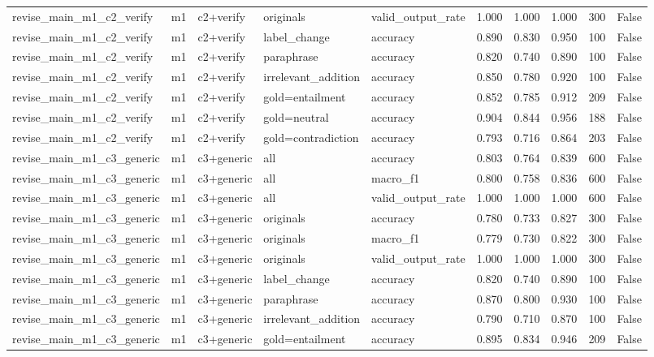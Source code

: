 \begin{tabular}{llllllllll}
revise\_main\_m1\_c2\_verify & m1 & c2+verify & originals & valid\_output\_rate & 1.000 & 1.000 & 1.000 & 300 & False \\
revise\_main\_m1\_c2\_verify & m1 & c2+verify & label\_change & accuracy & 0.890 & 0.830 & 0.950 & 100 & False \\
revise\_main\_m1\_c2\_verify & m1 & c2+verify & paraphrase & accuracy & 0.820 & 0.740 & 0.890 & 100 & False \\
revise\_main\_m1\_c2\_verify & m1 & c2+verify & irrelevant\_addition & accuracy & 0.850 & 0.780 & 0.920 & 100 & False \\
revise\_main\_m1\_c2\_verify & m1 & c2+verify & gold=entailment & accuracy & 0.852 & 0.785 & 0.912 & 209 & False \\
revise\_main\_m1\_c2\_verify & m1 & c2+verify & gold=neutral & accuracy & 0.904 & 0.844 & 0.956 & 188 & False \\
revise\_main\_m1\_c2\_verify & m1 & c2+verify & gold=contradiction & accuracy & 0.793 & 0.716 & 0.864 & 203 & False \\
revise\_main\_m1\_c3\_generic & m1 & c3+generic & all & accuracy & 0.803 & 0.764 & 0.839 & 600 & False \\
revise\_main\_m1\_c3\_generic & m1 & c3+generic & all & macro\_f1 & 0.800 & 0.758 & 0.836 & 600 & False \\
revise\_main\_m1\_c3\_generic & m1 & c3+generic & all & valid\_output\_rate & 1.000 & 1.000 & 1.000 & 600 & False \\
revise\_main\_m1\_c3\_generic & m1 & c3+generic & originals & accuracy & 0.780 & 0.733 & 0.827 & 300 & False \\
revise\_main\_m1\_c3\_generic & m1 & c3+generic & originals & macro\_f1 & 0.779 & 0.730 & 0.822 & 300 & False \\
revise\_main\_m1\_c3\_generic & m1 & c3+generic & originals & valid\_output\_rate & 1.000 & 1.000 & 1.000 & 300 & False \\
revise\_main\_m1\_c3\_generic & m1 & c3+generic & label\_change & accuracy & 0.820 & 0.740 & 0.890 & 100 & False \\
revise\_main\_m1\_c3\_generic & m1 & c3+generic & paraphrase & accuracy & 0.870 & 0.800 & 0.930 & 100 & False \\
revise\_main\_m1\_c3\_generic & m1 & c3+generic & irrelevant\_addition & accuracy & 0.790 & 0.710 & 0.870 & 100 & False \\
revise\_main\_m1\_c3\_generic & m1 & c3+generic & gold=entailment & accuracy & 0.895 & 0.834 & 0.946 & 209 & False \\

\end{tabular}
